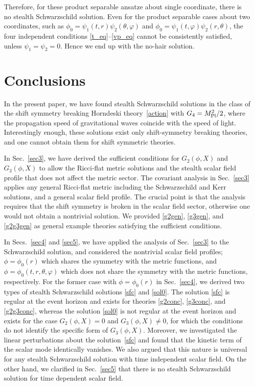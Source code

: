 \documentclass[prd,amsmath,amssymb,floatfix,superscriptaddress,notitlepage,nofootinbib,preprintnumbers]{revtex4-1}
\newcommand{\Mpl}{M_{\rm Pl}}
\begin{document}
Therefore, for these product separable ansatze about single coordinate,
there is no stealth Schwarzschild solution.
Even for the product separable cases about two coordinates, 
such as 
$\phi_0=\psi_1(t,r)\psi_2(\theta,\varphi)$
and 
$\phi_0=\psi_1(t,\varphi)\psi_2(r,\theta)$,
the four independent conditions \eqref{t_eq}--\eqref{vp_eq}
cannot be consistently satisfied, 
unless $\psi_1=\psi_2=0$.
Hence we end up with the no-hair solution. 



\section{Conclusions}
\label{sec6}


In the present paper, we have found stealth Schwarzschild solutions
in the class of the shift symmetry breaking Horndeski theory~\eqref{action} with $G_4=\Mpl^2/2$,
where the propagation speed of gravitational waves coincide with the speed of light. 
Interestingly enough, these solutions exist only shift-symmetry breaking theories, 
and one cannot obtain them for shift symmetric theories.


In Sec.~\ref{sec3}, we have derived the sufficient conditions 
for $G_2(\phi,X)$ and $G_3(\phi,X)$ to allow the Ricci-flat metric solutions  
and the stealth scalar field profile that does not affect the metric sector.
The covariant analysis in Sec.~\ref{sec3} applies 
any general Ricci-flat metric including the Schwarzschild and Kerr solutions, 
and a general scalar field profile.
The crucial point is that the analysis requires that 
the shift symmetry is broken in the scalar field sector, 
otherwise one would not obtain a nontrivial solution.
We provided \eqref{g2gen}, %
\eqref{g3gen}, and \eqref{g2g3gen} 
as general example theories satisfying the sufficient conditions.


In Secs.~\ref{sec4} and \ref{sec5}, 
we have applied the analysis of Sec.~\ref{sec3} to the Schwarzschild solution,
and considered the nontrivial scalar field profiles;
$\phi=\phi_0(r)$
which shares the symmetry with the metric functions,
and $\phi=\phi_0(t,r,\theta,\varphi)$
which does not share the symmetry with the metric functions,
respectively.
For the former case with $\phi=\phi_0(r)$ in Sec.~\ref{sec4}, 
we derived two types of stealth Schwarzschild solutions \eqref{sfc} and \eqref{sol0}.
The solution \eqref{sfc} is regular at the event horizon and 
exists for theories \eqref{g2conc}, \eqref{g3conc}, and \eqref{g2g3conc},
whereas the solution \eqref{sol0} is not regular at the event horizon and 
exists for the case $G_2(\phi,X)=0$ and $G_3(\phi,X)\neq 0$,
for which the conditions do not identify the specific form of $G_3(\phi,X)$.
Moreover, we investigated the linear perturbations about the solution~\eqref{sfc} and 
found that the kinetic term of the scalar mode identically vanishes. 
We also argued that this nature is universal for any stealth Schwarzschild solution
with time independent scalar field. 
On the other hand, we clarified in Sec.~\ref{sec5} that there is no stealth Schwarzschild solution for time dependent scalar field.
\end{document}
